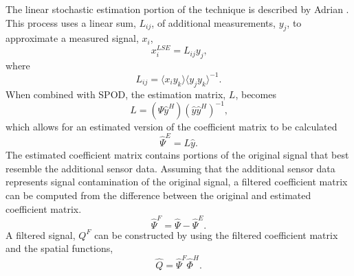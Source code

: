 The linear stochastic estimation portion of the technique is described by Adrian \cite{Adrian-1975-VenaZyuv}.
This process uses a linear sum, $L_{ij}$, of additional measurements, $y_j$, to approximate a measured signal, $x_i$,
\begin{equation}
  x_i^{LSE}=L_{ij}y_j \textrm{,}
  \label{eqn:07_lse_01}
\end{equation}
where
\begin{equation}
  L_{ij} = \langle x_iy_k\rangle\langle y_jy_k\rangle^{-1} \textrm{.}
  \label{eqn:07_lse_02}
\end{equation}
When combined with SPOD, the estimation matrix, $L$, becomes
\begin{equation}
  L=(\hat{\Psi}\hat{y}^H)(\hat{y}\hat{y}^H)^{-1} \textrm{,}
  \label{eqn:07_lse_spod_01}
\end{equation}
which allows for an estimated version of the coefficient matrix to be calculated
\begin{equation}
  \hat{\Psi}^E=L\hat{y} \textrm{.}
  \label{eqn:07_lse_spod_02}
\end{equation}
The estimated coefficient matrix contains portions of the original signal that best resemble the additional sensor data.
Assuming that the additional sensor data represents signal contamination of the original signal, a filtered coefficient matrix can be computed from the difference between the original and estimated coefficient matrix.
\begin{equation}
  \hat{\Psi}^F=\hat{\Psi}-\hat{\Psi}^E \textrm{.}
  \label{eqn:07_lse_spod_03}
\end{equation}
A filtered signal, $Q^F$ can be constructed by using the filtered coefficient matrix and the spatial functions,
\begin{equation}
  \hat{Q} = \hat{\Psi}^F\hat{\Phi}^H \textrm{.}
\end{equation}

